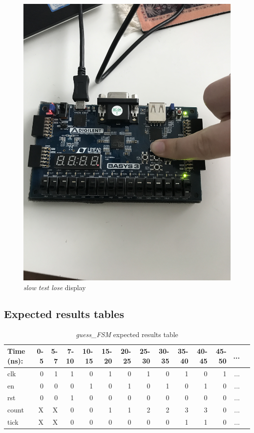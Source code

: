 \documentclass[11pt]{article}
\begin{document}
\begin{figure}[ht]\centering
	\includegraphics[angle = 270, width=1\textwidth]{slow2}
	\caption{\textit{slow test lose} display}
	\label{fig:sim_with_table}
\end{figure}



\clearpage
\subsection*{Expected results tables}

\begin{table}[ht]\centering
	\caption{\textit{guess\_FSM} expected results table}
	\label{ALU:tbl:alu_ERT}\medskip
	\begin{tabular}{l|rrrrrrrrrrrrr}
		Time (ns): & 0-5 & 5-7 & 7-10 & 10-15 & 15-20 & 20-25 & 25-30 & 30-35 & 35-40 & 40-45 & 45-50 &...\\
		\midrule
		clk & 0  & 1 & 1 & 0 & 1 & 0 & 1 & 0 & 1 & 0 & 1 & ... \\
		en & 0 & 0 & 0 & 1 & 0 & 1 & 0 & 1 & 0 & 1 & 0 & ...\\
		rst & 0 & 0 & 1& 0 & 0 & 0 & 0 & 0 & 0 & 0 & 0 & ... \\
		\midrule
		count & X & X & 0 & 0  & 1 & 1 & 2 & 2 & 3 & 3 & 0 & ... \\
		tick & X & X & 0 & 0 & 0 & 0 & 0 & 0 & 1 & 1 & 0& ... \\
		\bottomrule
	\end{tabular}
\end{table}
\end{document}
